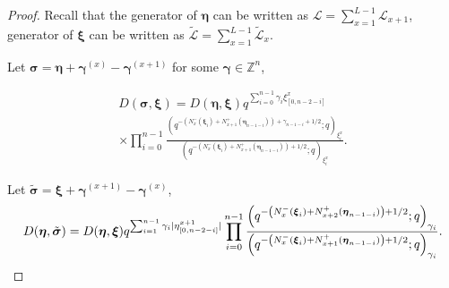 \documentclass{ximera}
\begin{document}
\begin{proof}

Recall that the generator of $\boldsymbol\eta$ can be written as $\mathcal{L}=\sum_{x=1}^{L-1}\mathcal{L}_{x+1}$, generator of $\boldsymbol\xi$ can be written as $\tilde{\mathcal{L}}=\sum_{x=1}^{L-1}\tilde{\mathcal{L}}_x$.



 Let $\boldsymbol\sigma=\boldsymbol\eta+\boldsymbol\gamma^{(x)}-\boldsymbol\gamma^{(x+1)}$ for some $\boldsymbol\gamma\in \mathbb{Z}^{n}$,




\begin{multline*} D(\boldsymbol\sigma,\boldsymbol\xi)=D(\boldsymbol\eta,\boldsymbol\xi)q^{\sum_{i=0}^{n-1}\gamma_i\xi_{[0,n-2-i]}^{x}}\\
\times\prod_{i=0}^{n-1}\frac{\left(q^{-\left(N_{x}^-(\boldsymbol\xi_i)+N_{x+1}^+(\boldsymbol\eta_{n-1-i})\right)+\gamma_{n-1-i}+1/2};q\right)_{\xi_i^x}}{\left(q^{-\left(N_{x}^-(\boldsymbol\xi_i)+N_{x+1}^+(\boldsymbol\eta_{n-1-i})\right)+1/2};q\right)_{\xi_i^x}}.
\end{multline*}



Let $\tilde{\boldsymbol\sigma}=\boldsymbol\xi+\boldsymbol\gamma^{(x+1)}-\boldsymbol\gamma^{(x)}$,
\begin{equation*}
  D(\boldsymbol\eta,\tilde{\boldsymbol\sigma})%
  =D(\boldsymbol\eta,\boldsymbol\xi)q^{\sum_{i=1}^{n-1}\gamma_i\mid\eta_{[0,n-2-i]}^{x+1}\mid}\prod_{i=0}^{n-1}\frac{\left(q^{-\left(N_{x}^-(\boldsymbol\xi_i)+N_{x+2}^+(\boldsymbol\eta_{n-1-i})\right)+1/2};q\right)_{\gamma_i}}{\left(q^{-\left(N_{x}^-(\boldsymbol\xi_i)+N_{x+1}^+(\boldsymbol\eta_{n-1-i})\right)+1/2};q\right)_{\gamma_i}}.\\
\end{equation*}




\end{proof}
\end{document}
